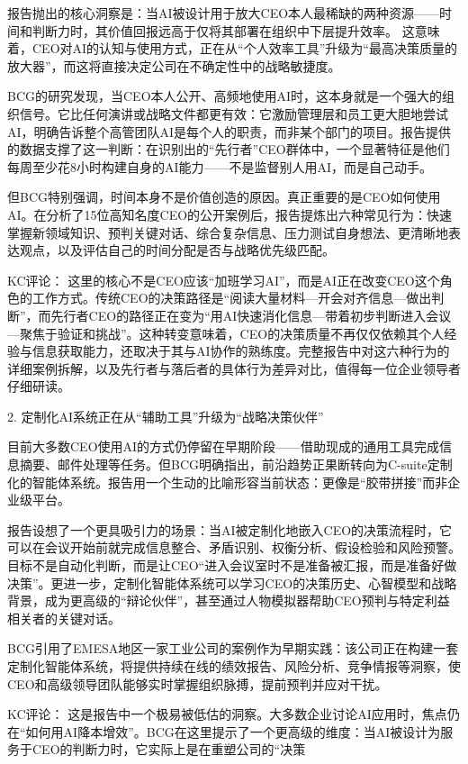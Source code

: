 \documentclass[11pt]{ctexart}
\begin{document}
报告抛出的核心洞察是：当AI被设计用于放大CEO本人最稀缺的两种资源——时间和判断力时，其价值回报远高于仅将其部署在组织中下层提升效率。 这意味着，CEO对AI的认知与使用方式，正在从“个人效率工具”升级为“最高决策质量的放大器”，而这将直接决定公司在不确定性中的战略敏捷度。

BCG的研究发现，当CEO本人公开、高频地使用AI时，这本身就是一个强大的组织信号。它比任何演讲或战略文件都更有效：它激励管理层和员工更大胆地尝试AI，明确告诉整个高管团队AI是每个人的职责，而非某个部门的项目。报告提供的数据支撑了这一判断：在识别出的“先行者”CEO群体中，一个显著特征是他们每周至少花8小时构建自身的AI能力——不是监督别人用AI，而是自己动手。

但BCG特别强调，时间本身不是价值创造的原因。真正重要的是CEO如何使用AI。在分析了15位高知名度CEO的公开案例后，报告提炼出六种常见行为：快速掌握新领域知识、预判关键对话、综合复杂信息、压力测试自身想法、更清晰地表达观点，以及评估自己的时间分配是否与战略优先级匹配。

KC评论： 这里的核心不是CEO应该“加班学习AI”，而是AI正在改变CEO这个角色的工作方式。传统CEO的决策路径是“阅读大量材料—开会对齐信息—做出判断”，而先行者CEO的路径正在变为“用AI快速消化信息—带着初步判断进入会议—聚焦于验证和挑战”。这种转变意味着，CEO的决策质量不再仅仅依赖其个人经验与信息获取能力，还取决于其与AI协作的熟练度。完整报告中对这六种行为的详细案例拆解，以及先行者与落后者的具体行为差异对比，值得每一位企业领导者仔细研读。

2. 定制化AI系统正在从“辅助工具”升级为“战略决策伙伴”

目前大多数CEO使用AI的方式仍停留在早期阶段——借助现成的通用工具完成信息摘要、邮件处理等任务。但BCG明确指出，前沿趋势正果断转向为C-suite定制化的智能体系统。报告用一个生动的比喻形容当前状态：更像是“胶带拼接”而非企业级平台。

报告设想了一个更具吸引力的场景：当AI被定制化地嵌入CEO的决策流程时，它可以在会议开始前就完成信息整合、矛盾识别、权衡分析、假设检验和风险预警。目标不是自动化判断，而是让CEO“进入会议室时不是准备被汇报，而是准备好做决策”。更进一步，定制化智能体系统可以学习CEO的决策历史、心智模型和战略背景，成为更高级的“辩论伙伴”，甚至通过人物模拟器帮助CEO预判与特定利益相关者的关键对话。

BCG引用了EMESA地区一家工业公司的案例作为早期实践：该公司正在构建一套定制化智能体系统，将提供持续在线的绩效报告、风险分析、竞争情报等洞察，使CEO和高级领导团队能够实时掌握组织脉搏，提前预判并应对干扰。

KC评论： 这是报告中一个极易被低估的洞察。大多数企业讨论AI应用时，焦点仍在“如何用AI降本增效”。BCG在这里提示了一个更高级的维度：当AI被设计为服务于CEO的判断力时，它实际上是在重塑公司的“决策
\end{document}
